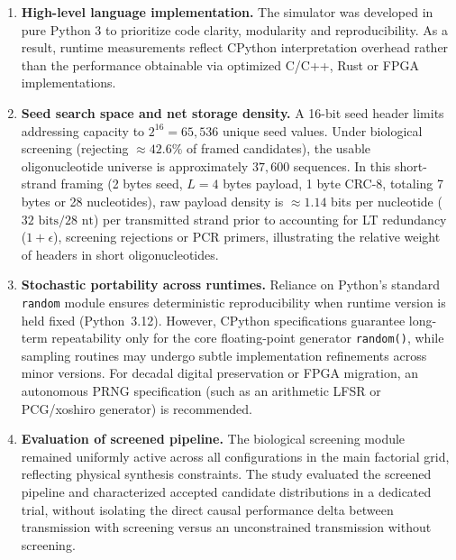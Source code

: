 \begin{enumerate}
    \item \textbf{High-level language implementation.} The simulator was developed in pure Python 3 to prioritize code clarity, modularity and reproducibility. As a result, runtime measurements reflect CPython interpretation overhead rather than the performance obtainable via optimized C/C++, Rust or FPGA implementations.
    
    \item \textbf{Seed search space and net storage density.} A 16-bit seed header limits addressing capacity to $2^{16} = 65{,}536$ unique seed values. Under biological screening (rejecting $\approx 42.6\%$ of framed candidates), the usable oligonucleotide universe is approximately $37{,}600$ sequences. In this short-strand framing (2 bytes seed, $L=4$ bytes payload, 1 byte CRC-8, totaling 7 bytes or 28 nucleotides), raw payload density is $\approx 1.14$ bits per nucleotide ($32\text{ bits} / 28\text{ nt}$) per transmitted strand prior to accounting for LT redundancy ($1+\epsilon$), screening rejections or PCR primers, illustrating the relative weight of headers in short oligonucleotides.
    
    \item \textbf{Stochastic portability across runtimes.} Reliance on Python's standard \texttt{random} module ensures deterministic reproducibility when runtime version is held fixed (Python~3.12). However, CPython specifications guarantee long-term repeatability only for the core floating-point generator \texttt{random()}, while sampling routines may undergo subtle implementation refinements across minor versions. For decadal digital preservation or FPGA migration, an autonomous PRNG specification (such as an arithmetic LFSR or PCG/xoshiro generator) is recommended.
    
    \item \textbf{Evaluation of screened pipeline.} The biological screening module remained uniformly active across all configurations in the main factorial grid, reflecting physical synthesis constraints. The study evaluated the screened pipeline and characterized accepted candidate distributions in a dedicated trial, without isolating the direct causal performance delta between transmission with screening versus an unconstrained transmission without screening.
    

\end{enumerate}
